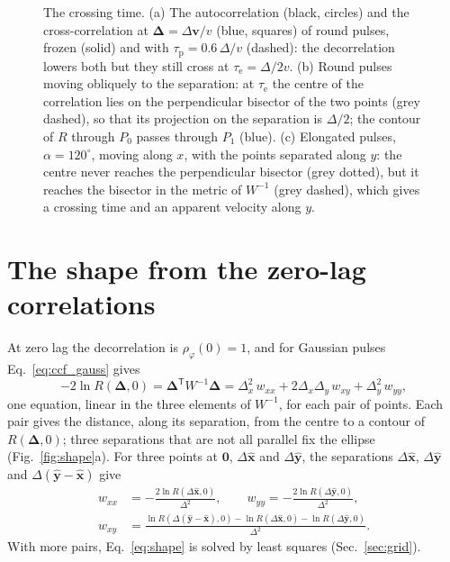 \documentclass[aps,pre,11pt,a4paper,preprint,amsmath,amssymb,groupedaddress]{revtex4-2}
\newcommand{\Eqref}[1]{Eq.~\eqref{#1}}
\newcommand{\Figref}[1]{Fig.~\ref{#1}}
\newcommand{\Secref}[1]{Sec.~\ref{#1}}
\newcommand{\bv}{\ensuremath{\bm{v}}}
\newcommand{\bD}{\ensuremath{\bm{\Delta}}}
\newcommand{\bex}{\ensuremath{\hat{\bm{x}}}}
\newcommand{\bey}{\ensuremath{\hat{\bm{y}}}}
\newcommand{\T}{\ensuremath{\mathsf{T}}}
\newcommand{\rphi}{\ensuremath{\rho_\varphi}}
\newcommand{\taud}{\ensuremath{\tau_\text{p}}}
\newcommand{\taue}{\ensuremath{\tau_\text{e}}}
\newcommand{\Wi}{\ensuremath{W^{-1}}}
\newcommand{\w}[1]{\ensuremath{w_{#1}}}
\begin{document}
\begin{figure}
\caption{The crossing time. (a) The autocorrelation (black, circles) and the cross-correlation at $\bD = \Delta\bv/v$ (blue, squares) of round pulses, frozen (solid) and with $\taud = 0.6\,\Delta/v$ (dashed): the decorrelation lowers both but they still cross at $\taue = \Delta/2v$. (b) Round pulses moving obliquely to the separation: at \taue{} the centre of the correlation lies on the perpendicular bisector of the two points (grey dashed), so that its projection on the separation is $\Delta/2$; the contour of $R$ through $P_0$ passes through $P_1$ (blue). (c) Elongated pulses, $\alpha = 120^\circ$, moving along $x$, with the points separated along $y$: the centre never reaches the perpendicular bisector (grey dotted), but it reaches the bisector in the metric of \Wi{} (grey dashed), which gives a crossing time and an apparent velocity along $y$.}
\label{fig:crossing}
\end{figure}

\section{The shape from the zero-lag correlations}
\label{sec:shape}

At zero lag the decorrelation is $\rphi(0) = 1$, and for Gaussian pulses \Eqref{eq:ccf_gauss} gives
%
\begin{equation}
\label{eq:shape}
-2\ln R(\bD, 0) = \bD^\T \Wi \bD = \Delta_x^2\, \w{xx} + 2\Delta_x\Delta_y\, \w{xy} + \Delta_y^2\, \w{yy},
\end{equation}
%
one equation, linear in the three elements of \Wi, for each pair of points. Each pair gives the distance, along its separation, from the centre to a contour of $R(\bD,0)$; three separations that are not all parallel fix the ellipse (\Figref{fig:shape}a). For three points at $\bm{0}$, $\Delta\bex$ and $\Delta\bey$, the separations $\Delta\bex$, $\Delta\bey$ and $\Delta(\bey-\bex)$ give
%
\begin{equation}
\label{eq:shape_triangle}
\begin{aligned}
\w{xx} &= -\frac{2\ln R(\Delta\bex, 0)}{\Delta^2},
\qquad
\w{yy} = -\frac{2\ln R(\Delta\bey, 0)}{\Delta^2},
\\
\w{xy} &= \frac{\ln R(\Delta(\bey - \bex), 0) - \ln R(\Delta\bex, 0) - \ln R(\Delta\bey, 0)}{\Delta^2}.
\end{aligned}
\end{equation}
%
With more pairs, \Eqref{eq:shape} is solved by least squares (\Secref{sec:grid}).
\end{document}
